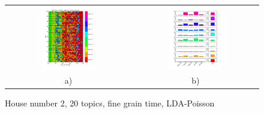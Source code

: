 \begin{figure}[h!]
 \centering
 \begin{tabular}{c c}
  \includegraphics[width=0.45\textwidth]{Pictures/Pois/fine/DayHN2TS48k20fine.png}
  &
  \includegraphics[width=0.45\textwidth]{Pictures/Pois/fine/TopHN2TS48k20fine.png}\\
  a) & b)
 \end{tabular}
  \caption{House number 2, 20 topics, fine grain time, LDA-Poisson}
\end{figure}

